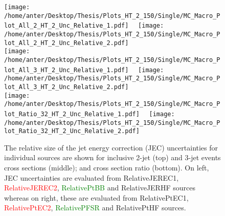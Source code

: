 \begin{figure}[!hbtp]
\hspace*{-5mm}\texttt{[image: /home/anter/Desktop/Thesis/Plots\_HT\_2\_150/Single/MC\_Macro\_Plot\_All\_2\_HT\_2\_Unc\_Relative\_1.pdf]}%
~~\texttt{[image: /home/anter/Desktop/Thesis/Plots\_HT\_2\_150/Single/MC\_Macro\_Plot\_All\_2\_HT\_2\_Unc\_Relative\_2.pdf]}\\
\hspace*{-5mm}\texttt{[image: /home/anter/Desktop/Thesis/Plots\_HT\_2\_150/Single/MC\_Macro\_Plot\_All\_3\_HT\_2\_Unc\_Relative\_1.pdf]}%
~~\texttt{[image: /home/anter/Desktop/Thesis/Plots\_HT\_2\_150/Single/MC\_Macro\_Plot\_All\_3\_HT\_2\_Unc\_Relative\_2.pdf]}\\
\hspace*{-5mm}\texttt{[image: /home/anter/Desktop/Thesis/Plots\_HT\_2\_150/Single/MC\_Macro\_Plot\_Ratio\_32\_HT\_2\_Unc\_Relative\_1.pdf]}%
~~\texttt{[image: /home/anter/Desktop/Thesis/Plots\_HT\_2\_150/Single/MC\_Macro\_Plot\_Ratio\_32\_HT\_2\_Unc\_Relative\_2.pdf]}
\caption{The relative size of the jet energy correction (JEC) uncertainties for individual sources are shown for inclusive 2-jet (top) and 3-jet events cross sections (middle); and cross section ratio \ratio (bottom). On left, JEC uncertainties are evaluated from \textcolor{blue2}{RelativeJEREC1}, \textcolor{red}{RelativeJEREC2}, \textcolor{green}{RelativePtBB} and \textcolor{pink2}{RelativeJERHF} sources whereas on right, these are evaluated from \textcolor{blue2}{RelativePtEC1}, \textcolor{red}{RelativePtEC2}, \textcolor{green}{RelativePFSR} and \textcolor{pink2}{RelativePtHF} sources.}
\label{fig:jes2}
\end{figure}

